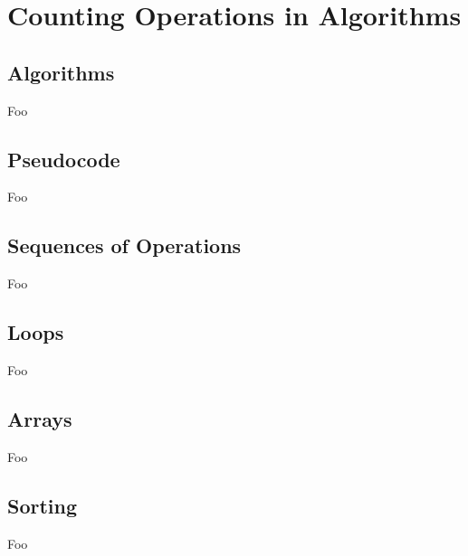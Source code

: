 \section{Counting Operations in Algorithms}

\subsection{Algorithms}

Foo

\subsection{Pseudocode}

Foo

\subsection{Sequences of Operations}

Foo

\subsection{Loops}

Foo

\subsection{Arrays}

Foo

\subsection{Sorting}

Foo

